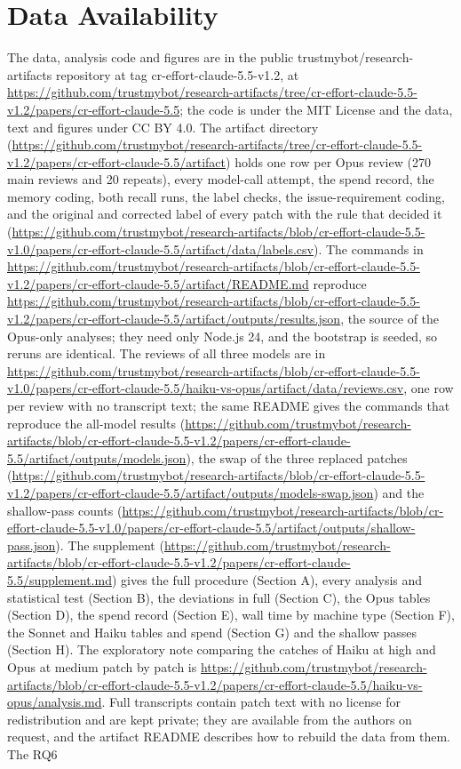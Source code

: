 \documentclass[sigconf,nonacm]{acmart}
\begin{document}
\section{Data Availability}\label{sec:data}

The data, analysis code and figures are in the public trustmybot/\allowbreak research-artifacts repository at tag cr-effort-claude-5.5-v1.2, at \url{https://github.com/trustmybot/research-artifacts/tree/cr-effort-claude-5.5-v1.2/papers/cr-effort-claude-5.5}; the code is under the MIT License and the data, text and figures under CC BY 4.0. The artifact directory (\url{https://github.com/trustmybot/research-artifacts/tree/cr-effort-claude-5.5-v1.2/papers/cr-effort-claude-5.5/artifact}) holds one row per Opus review (270 main reviews and 20 repeats), every model-call attempt, the spend record, the memory coding, both recall runs, the label checks, the issue-requirement coding, and the original and corrected label of every patch with the rule that decided it (\url{https://github.com/trustmybot/research-artifacts/blob/cr-effort-claude-5.5-v1.0/papers/cr-effort-claude-5.5/artifact/data/labels.csv}). The commands in \url{https://github.com/trustmybot/research-artifacts/blob/cr-effort-claude-5.5-v1.2/papers/cr-effort-claude-5.5/artifact/README.md} reproduce \url{https://github.com/trustmybot/research-artifacts/blob/cr-effort-claude-5.5-v1.2/papers/cr-effort-claude-5.5/artifact/outputs/results.json}, the source of the Opus-only analyses; they need only Node.js 24, and the bootstrap is seeded, so reruns are identical. The reviews of all three models are in \url{https://github.com/trustmybot/research-artifacts/blob/cr-effort-claude-5.5-v1.0/papers/cr-effort-claude-5.5/haiku-vs-opus/artifact/data/reviews.csv}, one row per review with no transcript text; the same README gives the commands that reproduce the all-model results (\url{https://github.com/trustmybot/research-artifacts/blob/cr-effort-claude-5.5-v1.2/papers/cr-effort-claude-5.5/artifact/outputs/models.json}), the swap of the three replaced patches (\url{https://github.com/trustmybot/research-artifacts/blob/cr-effort-claude-5.5-v1.2/papers/cr-effort-claude-5.5/artifact/outputs/models-swap.json}) and the shallow-pass counts (\url{https://github.com/trustmybot/research-artifacts/blob/cr-effort-claude-5.5-v1.0/papers/cr-effort-claude-5.5/artifact/outputs/shallow-pass.json}). The supplement (\url{https://github.com/trustmybot/research-artifacts/blob/cr-effort-claude-5.5-v1.2/papers/cr-effort-claude-5.5/supplement.md}) gives the full procedure (Section A), every analysis and statistical test (Section B), the deviations in full (Section C), the Opus tables (Section D), the spend record (Section E), wall time by machine type (Section F), the Sonnet and Haiku tables and spend (Section G) and the shallow passes (Section H). The exploratory note comparing the catches of Haiku at high and Opus at medium patch by patch is \url{https://github.com/trustmybot/research-artifacts/blob/cr-effort-claude-5.5-v1.2/papers/cr-effort-claude-5.5/haiku-vs-opus/analysis.md}. Full transcripts contain patch text with no license for redistribution and are kept private; they are available from the authors on request, and the artifact README describes how to rebuild the data from them. The RQ6 
\end{document}
